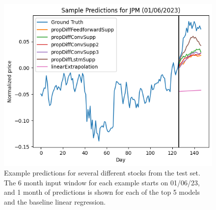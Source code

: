 \documentclass[conference]{IEEEtran}
\begin{document}
\begin{figure}
    \includegraphics[width=\columnwidth]{figures/jpmSample.png}
    \caption{Example predictions for several different stocks from the test set. The 6 month input window for each example starts on 01/06/23, and 1 month of predictions is shown for each of the top 5 models and the baseline linear regression.}
    \label{figure:examplePredictions}
\end{figure}

\clearpage
\nocite{*}


\end{document}

